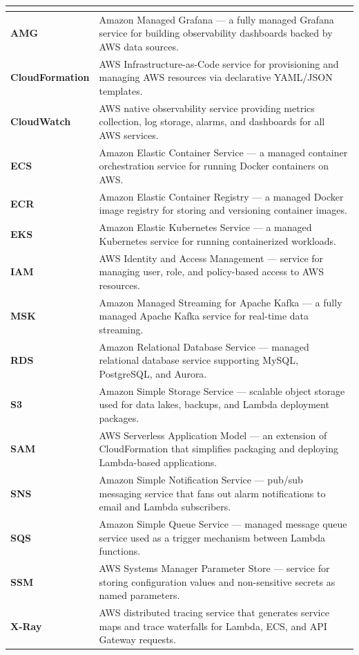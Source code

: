 {\begin{longtable}{@{\hspace{\tabcolsep}}>{\bfseries}p{}p{}@{\hspace{\tabcolsep}}}
\multicolumn{2}{l}{\textit{\textbf{AWS Services}}} \\
\hline
AMG & Amazon Managed Grafana — a fully managed Grafana service for building observability dashboards backed by AWS data sources. \\
CloudFormation & AWS Infrastructure-as-Code service for provisioning and managing AWS resources via declarative YAML/JSON templates. \\
CloudWatch & AWS native observability service providing metrics collection, log storage, alarms, and dashboards for all AWS services. \\
ECS & Amazon Elastic Container Service — a managed container orchestration service for running Docker containers on AWS. \\
ECR & Amazon Elastic Container Registry — a managed Docker image registry for storing and versioning container images. \\
EKS & Amazon Elastic Kubernetes Service — a managed Kubernetes service for running containerized workloads. \\
IAM & AWS Identity and Access Management — service for managing user, role, and policy-based access to AWS resources. \\
MSK & Amazon Managed Streaming for Apache Kafka — a fully managed Apache Kafka service for real-time data streaming. \\
RDS & Amazon Relational Database Service — managed relational database service supporting MySQL, PostgreSQL, and Aurora. \\
S3 & Amazon Simple Storage Service — scalable object storage used for data lakes, backups, and Lambda deployment packages. \\
SAM & AWS Serverless Application Model — an extension of CloudFormation that simplifies packaging and deploying Lambda-based applications. \\
SNS & Amazon Simple Notification Service — pub/sub messaging service that fans out alarm notifications to email and Lambda subscribers. \\
SQS & Amazon Simple Queue Service — managed message queue service used as a trigger mechanism between Lambda functions. \\
SSM & AWS Systems Manager Parameter Store — service for storing configuration values and non-sensitive secrets as named parameters. \\
X-Ray & AWS distributed tracing service that generates service maps and trace waterfalls for Lambda, ECS, and API Gateway requests. \\


\end{longtable}}
